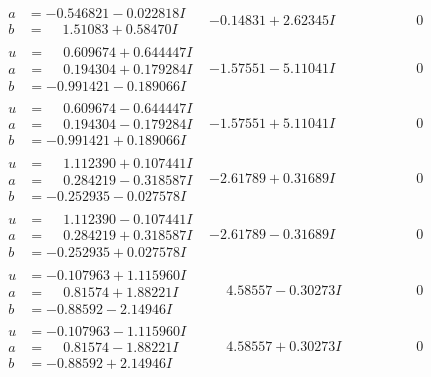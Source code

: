 \documentclass[1p]{elsarticle_modified}
\theoremstyle{definition}
\begin{document}
$$\begin{array}{c|c|c}
\begin{aligned}
a &= -0.546821 - 0.022818 I \\
b &= \phantom{-}1.51083 + 0.58470 I\end{aligned}
 & -0.14831 + 2.62345 I & \phantom{-0.000000 } 0 \\ \hline\begin{aligned}
u &= \phantom{-}0.609674 + 0.644447 I \\
a &= \phantom{-}0.194304 + 0.179284 I \\
b &= -0.991421 - 0.189066 I\end{aligned}
 & -1.57551 - 5.11041 I & \phantom{-0.000000 } 0 \\ \hline\begin{aligned}
u &= \phantom{-}0.609674 - 0.644447 I \\
a &= \phantom{-}0.194304 - 0.179284 I \\
b &= -0.991421 + 0.189066 I\end{aligned}
 & -1.57551 + 5.11041 I & \phantom{-0.000000 } 0 \\ \hline\begin{aligned}
u &= \phantom{-}1.112390 + 0.107441 I \\
a &= \phantom{-}0.284219 - 0.318587 I \\
b &= -0.252935 - 0.027578 I\end{aligned}
 & -2.61789 + 0.31689 I & \phantom{-0.000000 } 0 \\ \hline\begin{aligned}
u &= \phantom{-}1.112390 - 0.107441 I \\
a &= \phantom{-}0.284219 + 0.318587 I \\
b &= -0.252935 + 0.027578 I\end{aligned}
 & -2.61789 - 0.31689 I & \phantom{-0.000000 } 0 \\ \hline\begin{aligned}
u &= -0.107963 + 1.115960 I \\
a &= \phantom{-}0.81574 + 1.88221 I \\
b &= -0.88592 - 2.14946 I\end{aligned}
 & \phantom{-}4.58557 - 0.30273 I & \phantom{-0.000000 } 0 \\ \hline\begin{aligned}
u &= -0.107963 - 1.115960 I \\
a &= \phantom{-}0.81574 - 1.88221 I \\
b &= -0.88592 + 2.14946 I\end{aligned}
 & \phantom{-}4.58557 + 0.30273 I & \phantom{-0.000000 } 0 \\ \hline\begin{aligned}

\end{aligned}
\end{array}$$
\end{document}
